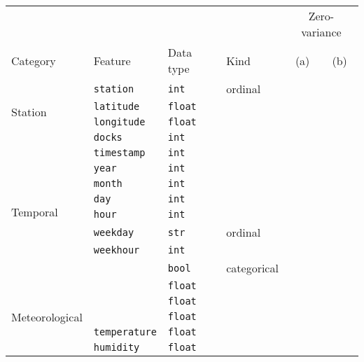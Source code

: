 
\begin{table}
  \newcommand{\tablefeaturesrow}[6]{#1 & #2 & #3 & #4 & #5 & #6 \\}
  \centering
  \begin{tabular}{llllcc}
    \toprule

     &  &  &  & \multicolumn{2}{c}{Zero-variance}
    \\

    \tablefeaturesrow{Category}{Feature}{Data type}{Kind}{(a)}{(b)}

    \midrule

    \tablefeaturesrow{\multirow{4}{*}{Station}}{\texttt{station}}{\texttt{int}}{ordinal}{\checkmark}{}

    \tablefeaturesrow{}{\texttt{latitude}}{\texttt{float}}{}{\checkmark}{}

    \tablefeaturesrow{}{\texttt{longitude}}{\texttt{float}}{}{\checkmark}{}

    \tablefeaturesrow{}{\texttt{docks}}{\texttt{int}}{}{\checkmark}{}

    \midrule

    \tablefeaturesrow{\multirow{8}{*}{Temporal}}{\texttt{timestamp}}{\texttt{int}}{}{}{}

    \tablefeaturesrow{}{\texttt{year}}{\texttt{int}}{}{\checkmark}{\checkmark}

    \tablefeaturesrow{}{\texttt{month}}{\texttt{int}}{}{\checkmark}{\checkmark}

    \tablefeaturesrow{}{\texttt{day}}{\texttt{int}}{}{}{}

    \tablefeaturesrow{}{\texttt{hour}}{\texttt{int}}{}{}{}

    \tablefeaturesrow{}{\texttt{weekday}}{\texttt{str}}{ordinal}{}{}

    \tablefeaturesrow{}{\texttt{weekhour}}{\texttt{int}}{}{}{}

    \tablefeaturesrow{}{\texttt{\isholiday}}{\texttt{bool}}{categorical}{}{}

    \midrule

    \tablefeaturesrow{\multirow{7}{*}{Meteorological}}{\texttt{\windspeedmax}}{\texttt{float}}{}{}{}

    \tablefeaturesrow{}{\texttt{\windspeedavg}}{\texttt{float}}{}{}{}

    \tablefeaturesrow{}{\texttt{\winddirection}}{\texttt{float}}{}{}{}

    \tablefeaturesrow{}{\texttt{temperature}}{\texttt{float}}{}{}{}

    \tablefeaturesrow{}{\texttt{humidity}}{\texttt{float}}{}{}{}


\end{tabular}
\end{table}
